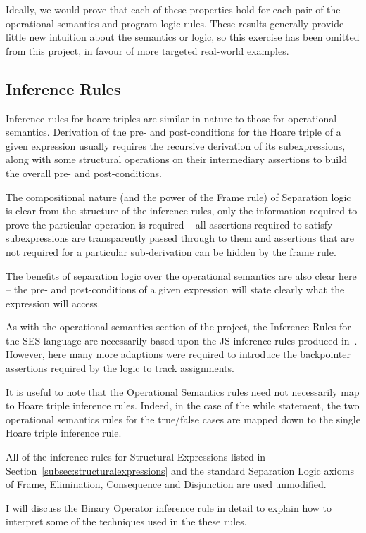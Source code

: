 \documentclass[a4paper,notitlepage]{report}
\begin{document}
Ideally, we would prove that each of these properties hold for each pair of the
operational semantics and program logic rules.
These results generally provide little new intuition about the
semantics or logic, so this exercise has been omitted from this project, in
favour of more targeted real-world examples.

\subsection{Inference Rules}
\label{sec:infrules}
Inference rules for hoare triples are similar in nature to those for operational
semantics. Derivation of the pre- and post-conditions for the Hoare triple of a
given expression usually requires the recursive derivation of its
subexpressions, along with some structural operations on their intermediary
assertions to build the overall pre- and post-conditions.

The compositional nature (and the power of the Frame rule) of Separation
logic is clear from the structure
of the inference rules, only the information required to prove the particular
operation is required -- all assertions required to satisfy subexpressions are
transparently passed through to them and assertions that are not required for a
particular sub-derivation can be hidden by the frame rule.

The benefits of separation logic over the operational semantics are also clear
here -- the pre- and post-conditions of a given expression will state clearly
what the expression will access.

As with the operational semantics section of the project, the Inference Rules
for the SES language are necessarily based upon the JS inference rules produced
in~\cite{gms-popl}. However, here many more adaptions were required to
introduce the backpointer assertions required by the logic to track assignments.

It is useful to note that the Operational Semantics rules need not necessarily
map to Hoare triple inference rules. Indeed, in the case of the while statement,
the two operational semantics rules for the true/false cases are mapped down to
the single Hoare triple inference rule.

All of the inference rules for Structural Expressions listed in
Section~\ref{subsec:structuralexpressions} and the standard Separation Logic
axioms of Frame, Elimination, Consequence and Disjunction are used unmodified.

I will discuss the Binary Operator inference rule in detail to explain how to
interpret some of the techniques used in the these rules.
\end{document}
